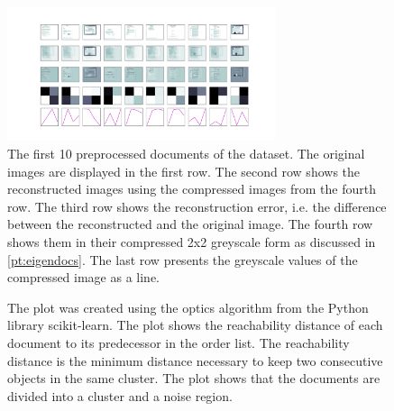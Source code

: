 \begin{figure}[htp] %
    \centering
    \includegraphics[width=0.7\textwidth]{images/OPTICS/eigendocs/eigendocs_2x2_dim.pdf}
    \caption{The first 10 preprocessed documents of the dataset.
    The original images are displayed in the first row.
    The second row shows the reconstructed images using the compressed images from the fourth row.
    The third row shows the reconstruction error, i.e. the difference between the reconstructed and the original image.
    The fourth row shows them in their compressed 2x2 greyscale form as discussed in \autoref{pt:eigendocs}.
    The last row presents the greyscale values of the compressed image as a line.
    }
    \label{fig:preprocessed_docs_eigendocs}
\end{figure}


\begin{figure}%
    \centering
    \qquad
    \caption{The plot was created using the \ac{optics} algorithm from the Python library scikit-learn.
    The plot shows the reachability distance of each document to its predecessor in the order list.
    The reachability distance is the minimum distance necessary to keep two consecutive objects in the same cluster.
    The plot shows that the documents are divided into a cluster and a noise region.}%
    \label{fig:reachability_plots}%
\end{figure}


